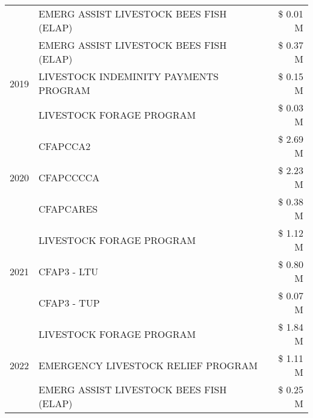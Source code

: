 \begin{tabular}{llr}
 & EMERG ASSIST LIVESTOCK BEES FISH (ELAP) & \$ 0.01 M \\
\cline{1-3}
\multirow[t]{3}{*}{2019} & EMERG ASSIST LIVESTOCK BEES FISH (ELAP) & \$ 0.37 M \\
 & LIVESTOCK INDEMINITY PAYMENTS PROGRAM & \$ 0.15 M \\
 & LIVESTOCK FORAGE PROGRAM & \$ 0.03 M \\
\cline{1-3}
\multirow[t]{3}{*}{2020} & CFAPCCA2 & \$ 2.69 M \\
 & CFAPCCCCA & \$ 2.23 M \\
 & CFAPCARES & \$ 0.38 M \\
\cline{1-3}
\multirow[t]{3}{*}{2021} & LIVESTOCK FORAGE PROGRAM & \$ 1.12 M \\
 & CFAP3 - LTU & \$ 0.80 M \\
 & CFAP3 - TUP & \$ 0.07 M \\
\cline{1-3}
\multirow[t]{3}{*}{2022} & LIVESTOCK FORAGE PROGRAM & \$ 1.84 M \\
 & EMERGENCY LIVESTOCK RELIEF PROGRAM & \$ 1.11 M \\
 & EMERG ASSIST LIVESTOCK BEES FISH (ELAP) & \$ 0.25 M \\
\cline{1-3}
\bottomrule
\end{tabular}
